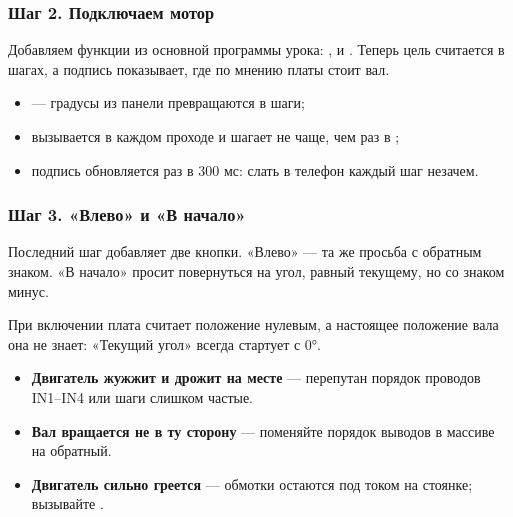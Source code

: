 \subsubsection{Шаг 2. Подключаем мотор}

Добавляем функции из основной программы урока: ,  и
. Теперь цель считается в шагах, а подпись показывает, где по мнению платы стоит вал.


\begin{itemize}[leftmargin=*]
  \item {} --- градусы из панели превращаются в шаги;
  \item {} вызывается в каждом проходе  и шагает не чаще, чем раз в ;
  \item подпись обновляется раз в 300 мс: слать в телефон каждый шаг незачем.
\end{itemize}

\subsubsection{Шаг 3. «Влево» и «В начало»}

Последний шаг добавляет две кнопки. «Влево» --- та же просьба с обратным знаком. «В начало» просит
повернуться на угол, равный текущему, но со знаком минус.


При включении плата считает положение нулевым, а настоящее положение вала она не знает: «Текущий угол»
всегда стартует с 0°.

\begin{trouble}
\begin{itemize}[leftmargin=*]
  \item \textbf{Двигатель жужжит и дрожит на месте} --- перепутан порядок проводов IN1--IN4 или шаги слишком частые.
  \item \textbf{Вал вращается не в ту сторону} --- поменяйте порядок выводов в массиве  на обратный.
  \item \textbf{Двигатель сильно греется} --- обмотки остаются под током на стоянке; вызывайте .
\end{itemize}
\end{trouble}

